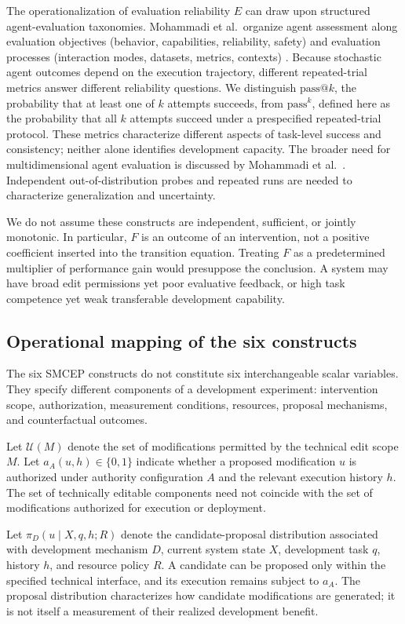\documentclass[11pt,a4paper]{article}
\begin{document}
The operationalization of evaluation reliability $E$ can draw upon structured agent-evaluation taxonomies. Mohammadi et al.\ organize agent assessment along evaluation objectives (behavior, capabilities, reliability, safety) and evaluation processes (interaction modes, datasets, metrics, contexts) \cite{mohammadi2025evaluation}. Because stochastic agent outcomes depend on the execution
trajectory, different repeated-trial metrics answer different reliability questions. We distinguish
$\mathrm{pass}@k$, the probability that at least one of $k$ attempts succeeds, from $\mathrm{pass}^k$, defined here as the probability that all $k$ attempts succeed under a prespecified repeated-trial protocol. These metrics characterize different aspects of task-level success and consistency; neither alone identifies development capacity. The broader need for multidimensional agent evaluation is discussed by Mohammadi et al.\ \cite{mohammadi2025evaluation}. Independent out-of-distribution probes and repeated runs are needed to characterize generalization and uncertainty.

We do not assume these constructs are independent, sufficient, or jointly monotonic. In particular, \(F\) is an outcome of an intervention, not a positive coefficient inserted into the transition equation. Treating \(F\) as a predetermined multiplier of performance gain would presuppose the conclusion. A system may have broad edit permissions yet poor evaluative feedback, or high task competence yet weak transferable development capability.

\subsection{Operational mapping of the six constructs}

The six SMCEP constructs do not constitute six
interchangeable scalar variables. They specify
different components of a development experiment:
intervention scope, authorization, measurement
conditions, resources, proposal mechanisms, and
counterfactual outcomes.

Let $\mathcal{U}(M)$ denote the set of modifications
permitted by the technical edit scope $M$.
Let $a_A(u,h)\in\{0,1\}$ indicate whether a proposed
modification $u$ is authorized under authority
configuration $A$ and the relevant execution
history $h$. The set of technically editable
components need not coincide with the set of
modifications authorized for execution or deployment.

Let $\pi_D(u\mid X,q,h;R)$ denote the
candidate-proposal distribution associated with
development mechanism $D$, current system state
$X$, development task $q$, history $h$, and
resource policy $R$. A candidate can be proposed
only within the specified technical interface,
and its execution remains subject to $a_A$.
The proposal distribution characterizes how
candidate modifications are generated; it is
not itself a measurement of their realized
development benefit.
\end{document}
